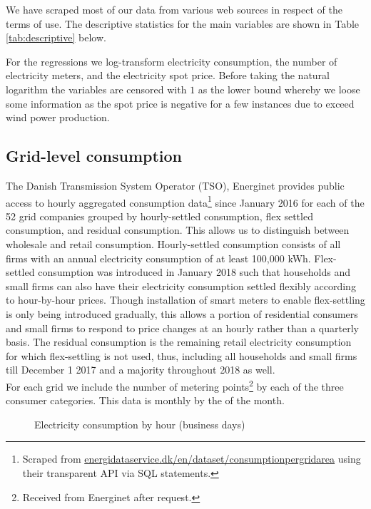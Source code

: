\label{sec:data}
We have scraped most of our data from various web sources in respect of the terms of use. The descriptive statistics for the main variables are shown in Table \ref{tab:descriptive} below.
\par
For the regressions we log-transform electricity consumption, the number of electricity meters, and the electricity spot price. Before taking the natural logarithm the variables are censored with $1$ as the lower bound whereby we loose some information as the spot price is negative for a few instances due to exceed wind power production.

\subsection{Grid-level consumption}
\label{subsec:d_consumption}
The Danish Transmission System Operator (TSO), Energinet provides public access to hourly aggregated consumption data\footnote{Scraped from \href{https://www.energidataservice.dk/en/dataset/consumptionpergridarea/}{energidataservice.dk/en/dataset/consumptionpergridarea} using their transparent API via SQL statements.} since January 2016 for each of the 52 grid companies grouped by hourly-settled consumption, flex settled consumption, and residual consumption. This allows us to distinguish between wholesale and retail consumption. Hourly-settled consumption consists of all firms with an annual electricity consumption of at least 100,000 kWh. Flex-settled consumption was introduced in January 2018 such that households and small firms can also have their electricity consumption settled flexibly according to hour-by-hour prices. Though installation of smart meters to enable flex-settling is only being introduced gradually, this allows a portion of residential consumers and small firms to respond to price changes at an hourly rather than a quarterly basis. The residual consumption is the remaining retail electricity consumption for which flex-settling is not used, thus, including all households and small firms till December 1 2017 and a majority throughout 2018 as well.
\medskip\\
For each grid we include the number of metering points\footnote{Received from Energinet after request.} by each of the three consumer categories. This data is monthly by the  of the month.
\begin{figure}[H]
  \centering
  \caption{Electricity consumption by hour (business days)}
  \label{fig:cons_hour}
\end{figure}


